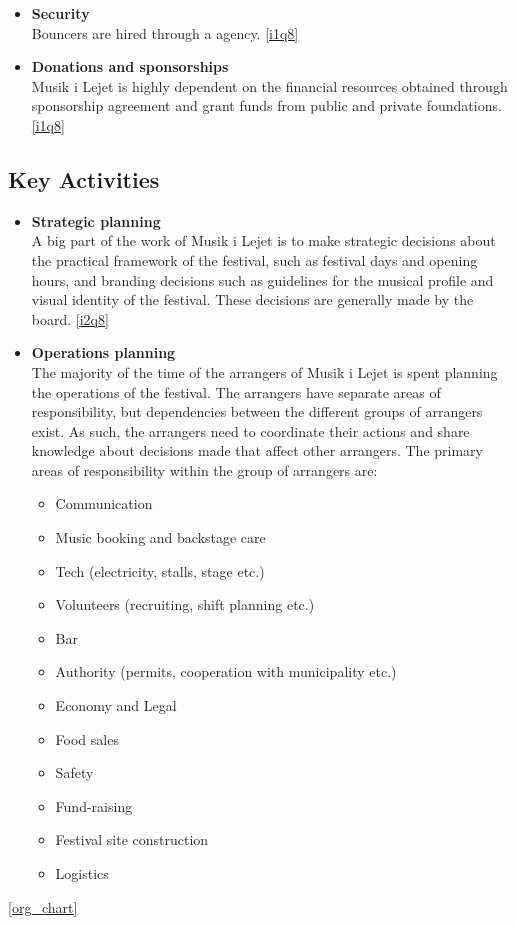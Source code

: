 \begin{itemize}
	\item \textbf{Security}\\
	Bouncers are hired through a agency. \ref{i1q8}
	\item \textbf{Donations and sponsorships}\\
	Musik i Lejet is highly dependent on the financial resources obtained through sponsorship agreement and grant funds from public and private foundations. \ref{i1q8}
\end{itemize}

\subsection{Key Activities} %
\label{sub:key_activities}
\begin{itemize}
	\item \textbf{Strategic planning}\\
	A big part of the work of Musik i Lejet is to make strategic decisions about the practical framework of the festival, such as festival days and opening hours, and branding decisions such as guidelines for the musical profile and visual identity of the festival. These decisions are generally made by the board. \ref{i2q8}
	\item \textbf{Operations planning}\\
	The majority of the time of the arrangers of Musik i Lejet is spent planning the operations of the festival. The arrangers have separate areas of responsibility, but dependencies between the different groups of arrangers exist. As such, the arrangers need to coordinate their actions and share knowledge about decisions made that affect other arrangers. The primary areas of responsibility within the group of arrangers are:
	\begin{itemize}
		\item Communication
		\item Music booking and backstage care
		\item Tech (electricity, stalls, stage etc.)
		\item Volunteers (recruiting, shift planning etc.)
		\item Bar
		\item Authority (permits, cooperation with municipality etc.)
		\item Economy and Legal
		\item Food sales
		\item Safety
		\item Fund-raising
		\item Festival site construction
		\item Logistics
	\end{itemize}
\end{itemize} \ref{org_chart}

